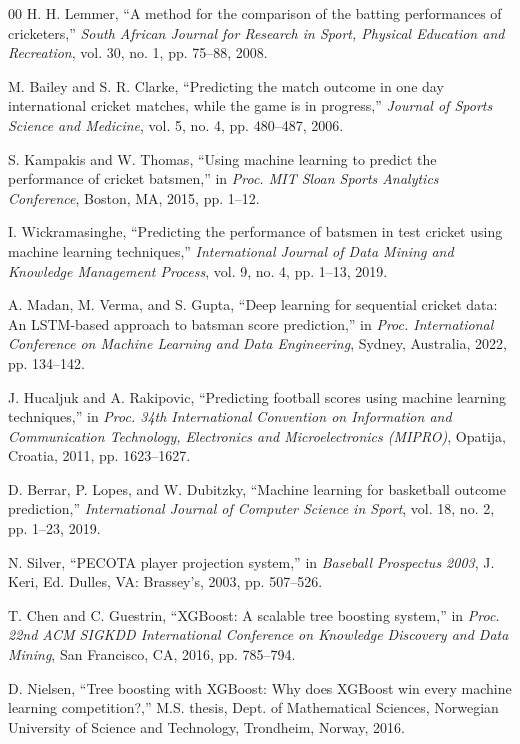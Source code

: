 \documentclass[conference]{IEEEtran}
\begin{document}
\begin{thebibliography}{00}
 H. H. Lemmer, ``A method for the comparison of the batting performances of cricketers,'' \textit{South African Journal for Research in Sport, Physical Education and Recreation}, vol. 30, no. 1, pp. 75–88, 2008.

 M. Bailey and S. R. Clarke, ``Predicting the match outcome in one day international cricket matches, while the game is in progress,'' \textit{Journal of Sports Science and Medicine}, vol. 5, no. 4, pp. 480–487, 2006.

 S. Kampakis and W. Thomas, ``Using machine learning to predict the performance of cricket batsmen,'' in \textit{Proc. MIT Sloan Sports Analytics Conference}, Boston, MA, 2015, pp. 1–12.

 I. Wickramasinghe, ``Predicting the performance of batsmen in test cricket using machine learning techniques,'' \textit{International Journal of Data Mining and Knowledge Management Process}, vol. 9, no. 4, pp. 1–13, 2019.

 A. Madan, M. Verma, and S. Gupta, ``Deep learning for sequential cricket data: An LSTM-based approach to batsman score prediction,'' in \textit{Proc. International Conference on Machine Learning and Data Engineering}, Sydney, Australia, 2022, pp. 134–142.

 J. Hucaljuk and A. Rakipovic, ``Predicting football scores using machine learning techniques,'' in \textit{Proc. 34th International Convention on Information and Communication Technology, Electronics and Microelectronics (MIPRO)}, Opatija, Croatia, 2011, pp. 1623–1627.

 D. Berrar, P. Lopes, and W. Dubitzky, ``Machine learning for basketball outcome prediction,'' \textit{International Journal of Computer Science in Sport}, vol. 18, no. 2, pp. 1–23, 2019.

 N. Silver, ``PECOTA player projection system,'' in \textit{Baseball Prospectus 2003}, J. Keri, Ed. Dulles, VA: Brassey's, 2003, pp. 507–526.

 T. Chen and C. Guestrin, ``XGBoost: A scalable tree boosting system,'' in \textit{Proc. 22nd ACM SIGKDD International Conference on Knowledge Discovery and Data Mining}, San Francisco, CA, 2016, pp. 785–794.

 D. Nielsen, ``Tree boosting with XGBoost: Why does XGBoost win every machine learning competition?,'' M.S. thesis, Dept. of Mathematical Sciences, Norwegian University of Science and Technology, Trondheim, Norway, 2016.


\end{thebibliography}
\end{document}
